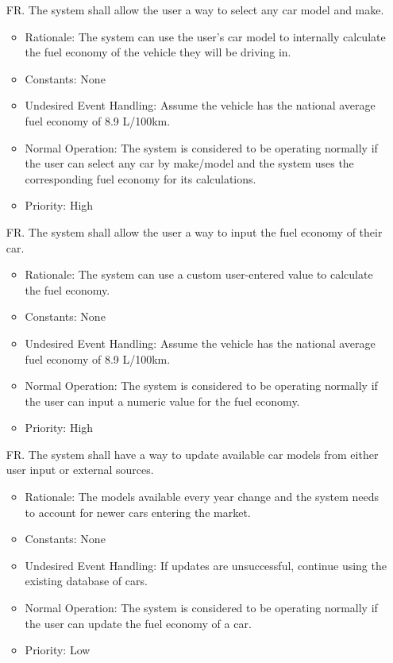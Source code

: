 \documentclass[12pt]{article}
\newcounter{reqnum} %
\begin{document}
\begin{itemize}
\item[FR\refstepcounter{reqnum}\thereqnum. ] The system shall allow the user a way to select any car model and make.
\begin{itemize}
    \item Rationale: The system can use the user’s car model to internally calculate the fuel economy of the vehicle they will be driving in.
    \item Constants: None
    \item Undesired Event Handling: Assume the vehicle has the national average fuel economy of 8.9 L/100km.
    \item Normal Operation: The system is considered to be operating normally if the user can select any car by make/model and the system uses the corresponding fuel economy for its calculations.
	\item Priority: High
\end{itemize}

\item[FR\refstepcounter{reqnum}\thereqnum. ] The system shall allow the user a way to input the fuel economy of their car.
\begin{itemize}
    \item Rationale: The system can use a custom user-entered value to calculate the fuel economy.
    \item Constants: None
    \item Undesired Event Handling: Assume the vehicle has the national average fuel economy of 8.9 L/100km.
    \item Normal Operation: The system is considered to be operating normally if the user can input a numeric value for the fuel economy.
	\item Priority: High
\end{itemize}

\item[FR\refstepcounter{reqnum}\thereqnum. ] The system shall have a way to update available car models from either user input or external sources.
\begin{itemize}
    \item Rationale: The models available every year change and the system needs to account for newer cars entering the market.
    \item Constants: None
    \item Undesired Event Handling: If updates are unsuccessful, continue using the existing database of cars.
    \item Normal Operation: The system is considered to be operating normally if the user can update the fuel economy of a car.
	\item Priority: Low
\end{itemize}


\end{itemize}
\end{document}

